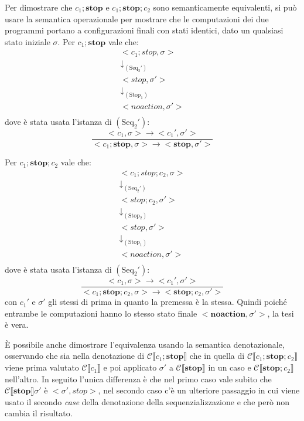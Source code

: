 \documentclass[a4paper,twosides]{report}
\begin{document}
Per dimostrare che $c_1;\mathbf{stop}$ e $c_1;\mathbf{stop};c_2$ sono
semanticamente equivalenti, si pu\`o usare la semantica operazionale
per mostrare che le computazioni dei due programmi portano a
configurazioni finali con stati identici, dato
un qualsiasi
stato iniziale $\sigma$.
Per $c_1;\mathbf{stop}$ vale che:
\begin{gather*}
  <c_1;stop,\sigma>\\
  \downarrow_{(\text{Seq}_2')}\\
  <stop,\sigma'>\\
  \downarrow_{(\text{Stop}_1)}\\
  <noaction,\sigma'>\\
\end{gather*}
dove \`e stata usata l'istanza di $(\text{Seq}_2')$:
$$
\frac{<c_1,\sigma> \longrightarrow{}
  <c_1',\sigma'>}{<c_1;\mathbf{stop},\sigma> \longrightarrow{}
  <\mathbf{stop},\sigma'>}
$$

Per $c_1;\mathbf{stop};c_2$ vale che:
\begin{gather*}
  <c_1;stop;c_2,\sigma>\\
  \downarrow_{(\text{Seq}_2')}\\
  <stop;c_2,\sigma'>\\
  \downarrow_{(\text{Stop}_2)}\\
  <stop,\sigma'>\\
  \downarrow_{(\text{Stop}_1)}\\
  <noaction,\sigma'>\\
\end{gather*}
dove \`e stata usata l'istanza di $(\text{Seq}_2')$:
$$
\frac{<c_1,\sigma> \longrightarrow{}
  <c_1',\sigma'>}{<c_1;\mathbf{stop};c_2,\sigma> \longrightarrow{}
  <\mathbf{stop};c_2,\sigma'>}
$$
con $c_1'$ e $\sigma'$ gli stessi di prima in quanto la premessa è la
stessa. Quindi poich\'e entrambe le computazioni hanno lo stesso stato
finale $<\mathbf{noaction},\sigma'>$, la tesi
\`e vera.

\`E possibile anche dimostrare l'equivalenza usando la semantica
denotazionale, osservando che sia nella denotazione di $\mathcal{C}\llbracket
c_1;\mathbf{stop}\rrbracket$ che in quella di $\mathcal{C}\llbracket
c_1;\mathbf{stop};c_2\rrbracket$ viene prima valutato $\mathcal{C}\llbracket
c_1\rrbracket$ e poi applicato $\sigma'$ a $\mathcal{C}\llbracket
\mathbf{stop}\rrbracket$ in un caso e $\mathcal{C}\llbracket
\mathbf{stop};c_2\rrbracket$ nell'altro. In seguito l'unica differenza
\`e che nel primo caso vale subito che $\mathcal{C}\llbracket
\mathbf{stop}\rrbracket\sigma'$ \`e $<\sigma',stop>$, nel secondo caso
c'è un ulteriore passaggio in cui viene usato il secondo \emph{case}
della denotazione della sequenzializzazione e che per\`o non cambia il
risultato.
\end{document}
